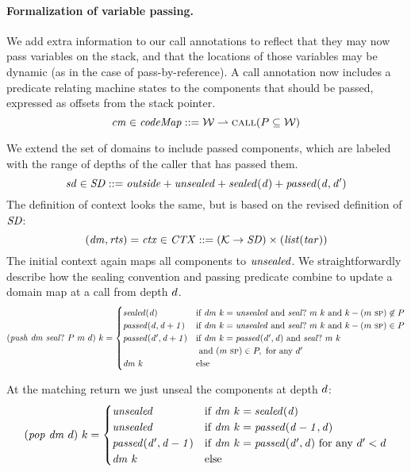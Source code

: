 \documentclass[acmsmall,review,anonymous]{acmart}\settopmatter{printfolios=true,printccs=false,printacmref=false}
\begin{document}
{\paragraph{Formalization of variable passing.}
We add extra information to our call
annotations to reflect that they may now pass variables on the stack, and that the locations
of those variables may be dynamic (as in the case of pass-by-reference).
A call annotation now includes a predicate relating machine states to the components
that should be passed, expressed as offsets from the stack pointer.
%
\[\mathit{cm} \in \mathit{codeMap} ::= {\mathcal W} \rightharpoonup \text{\sc call}(P \subseteq {\mathcal W})\]

We extend the set of domains to include passed components,
which are labeled with the range of depths of the caller that has passed them.
\[\mathit{sd} \in \mathit{SD} ::= \mathit{outside} + \mathit{unsealed} + \mathit{sealed(d)} + \mathit{passed(d,d')}\]
The definition of context looks the same, but is based on the revised definition of \(\mathit{SD}\):
\[(\mathit{dm},\mathit{rts}) = \mathit{ctx} \in \mathit{CTX} ::= ({\mathcal K} \rightarrow \mathit{SD})
\times (\mathit{list} (\mathit{tar})) \]
The initial context again maps all components to \(\mathit{unsealed}\).
We straightforwardly describe how the sealing convention and passing predicate combine to
update a domain map at a call from depth \(d\).
\[(\mathit{push} ~ \mathit{dm} ~ \mathit{seal?} ~ P ~ m ~ d) ~ k =
\begin{cases}
  \mathit{sealed(d)}              & \text{if } \mathit{dm} ~ k = \mathit{unsealed} \text{ and }
                                 \mathit{seal?} ~ m ~ k \text{ and }
                                 k - (m ~ \textsc{sp}) \not \in P \\
  \mathit{passed(d,d+1)}     & \text{if } \mathit{dm} ~ k = \mathit{unsealed} \text{ and }
                                 \mathit{seal?} ~ m ~ k \text{ and }
                                 k - (m ~ \textsc{sp}) \in P \\
  \mathit{passed(d',d+1)}    & \text{if } \mathit{dm} ~ k = \mathit{passed(d',d)} \text{ and }
                                 \mathit{seal?} ~ m ~ k \\
                               & \text{ and } (m ~ \textsc{sp}) \in P, \text{ for any } d' \\
  \mathit{dm}~k & \text{else} \\
\end{cases}\]

At the matching return we just unseal the components at depth \(d\):
%
\[(\mathit{pop} ~ \mathit{dm} ~ d) ~ k =
\begin{cases}
  \mathit{unsealed}                 & \text{if } \mathit{dm} ~ k = \mathit{sealed(d)} \\
  \mathit{unsealed}                 & \text{if } \mathit{dm} ~ k = \mathit{passed(d-1,d)} \\
  \mathit{passed(d',d-1)} & \text{if } \mathit{dm} ~ k = \mathit{passed(d',d)}
                              \text{ for any } d' < d \\
  \mathit{dm}~k        & \text{else} \\
\end{cases}\]

}
\end{document}
